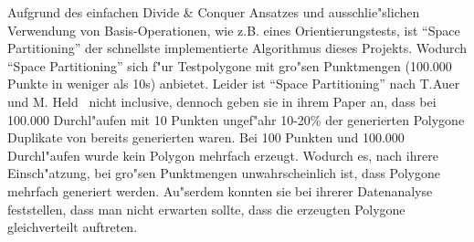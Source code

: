     Aufgrund des einfachen Divide \& Conquer Ansatzes und ausschlie"slichen
    Verwendung von Basis-Operationen, wie z.B. eines Orientierungstests, ist
    \enquote{Space Partitioning} der schnellste implementierte Algorithmus dieses
    Projekts. Wodurch \enquote{Space Partitioning} sich f"ur Testpolygone mit gro"sen
    Punktmengen (100.000 Punkte in weniger als 10s) anbietet. Leider ist ``Space
    Partitioning'' nach T.Auer und M. Held~\cite{held98polygons} nicht
    inclusive,  dennoch geben sie in ihrem Paper an, dass bei 100.000
    Durchl"aufen mit 10 Punkten ungef"ahr 10-20\% der generierten Polygone
    Duplikate von bereits generierten waren. Bei 100 Punkten und 100.000
    Durchl"aufen wurde kein Polygon mehrfach erzeugt. Wodurch es, nach ihrere
    Einsch"atzung, bei gro"sen Punktmengen unwahrscheinlich ist, dass Polygone
    mehrfach generiert werden. Au"serdem konnten sie bei ihrerer Datenanalyse
    feststellen, dass man nicht erwarten sollte, dass die erzeugten Polygone
    gleichverteilt auftreten.

